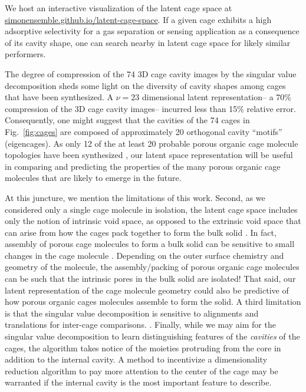 \documentclass[journal=jacsat,manuscript=article,layout=traditional]{achemso}
\begin{document}
We host an interactive visualization of the latent cage space at \url{simonensemble.github.io/latent-cage-space}. If a given cage exhibits a high adsorptive selectivity for a gas separation or sensing application as a consequence of its cavity shape, one can search nearby in latent cage space for likely similar performers.

The degree of compression of the 74 3D cage cavity images by the singular value decomposition sheds some light on the diversity of cavity shapes among cages that have been synthesized. A $\nu=23$ dimensional latent representation-- a 70\% compression of the 3D cage cavity images-- incurred less than 15\% relative error. Consequently, one might suggest that the cavities of the 74 cages in Fig.~\ref{fig:cages} are composed of approximately 20 orthogonal cavity ``motifs'' (eigencages). As only 12 of the at least 20 probable porous organic cage molecule topologies have been synthesized \cite{santolini2017topological}, our latent space representation will be useful in comparing and predicting the properties of the many porous organic cage molecules that are likely to emerge in the future.

At this juncture, we mention the limitations of this work. Second, as we considered only a single cage molecule in isolation, the latent cage space includes only the notion of intrinsic void space, as opposed to the extrinsic void space that can arise from how the cages pack together to form the bulk solid \cite{hasell2016porous}. In fact, assembly of porous cage molecules to form a bulk solid can be sensitive to small changes in the cage molecule \cite{hasell2014controlling}. Depending on the outer surface chemistry and geometry of the molecule, the assembly/packing of porous organic cage molecules can be such that the intrinsic pores in the bulk solid are isolated!\cite{tozawa2009porous} That said, our latent representation of the cage molecule geometry could also be predictive of how porous organic cages molecules assemble to form the solid. A third limitation is that the singular value decomposition is sensitive to alignments and translations for inter-cage comparisons. . {\color{red} Finally, while we may aim for the singular value decomposition to learn distinguishing features of the \emph{cavities} of the cages, the algorithm takes notice of the moieties protruding from the core in addition to the internal cavity. A method to incentivize a dimensionality reduction algorithm to pay more attention to the center of the cage may be warranted if the internal cavity is the most important feature to describe.}
\end{document}
